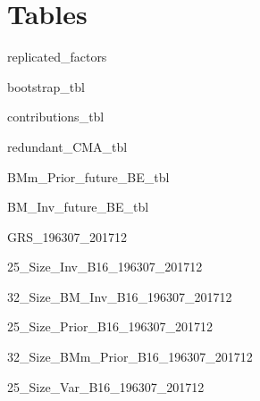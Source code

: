 
\section{Tables} \label{sec:tables}

{replicated_factors}

\begin{landscape}
{bootstrap_tbl}
\end{landscape}

{contributions_tbl}

{redundant_CMA_tbl}

{BMm_Prior_future_BE_tbl}

{BM_Inv_future_BE_tbl}

{GRS_196307_201712}

{25_Size_Inv_B16_196307_201712}

\begin{landscape}
{32_Size_BM_Inv_B16_196307_201712}
\end{landscape}

{25_Size_Prior_B16_196307_201712}

\begin{landscape}
{32_Size_BMm_Prior_B16_196307_201712}
\end{landscape}

{25_Size_Var_B16_196307_201712}
